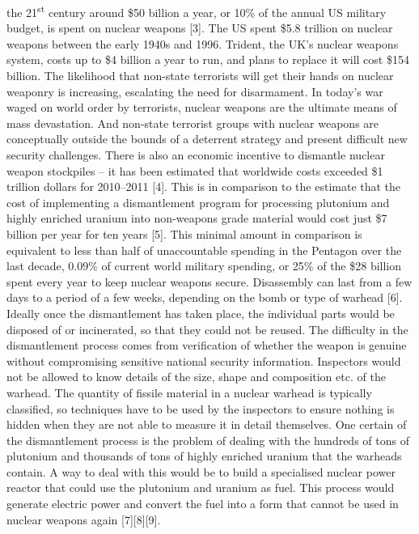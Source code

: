 \documentclass[twoside,titlepage,11pt,twocolumn,a4paper]{article}
\begin{document}
the 21\textsuperscript{st} century around \$50 billion a year, or 10\%
of the annual US military budget, is spent on nuclear weapons [3]. The
US spent \$5.8 trillion on nuclear weapons between the early 1940s and
1996. Trident, the UK's nuclear weapons system, costs up to \$4
billion a year to run, and plans to replace it will cost \$154
billion.  The likelihood that non-state terrorists will get their
hands on nuclear weaponry is increasing, escalating the need for
disarmament. In today's war waged on world order by terrorists,
nuclear weapons are the ultimate means of mass devastation. And
non-state terrorist groups with nuclear weapons are conceptually
outside the bounds of a deterrent strategy and present difficult new
security challenges.  There is also an economic incentive to dismantle
nuclear weapon stockpiles -- it has been estimated that worldwide
costs exceeded \$1 trillion dollars for 2010--2011 [4].  This is in
comparison to the estimate that the cost of implementing a
dismantlement program for processing plutonium and highly enriched
uranium into non-weapons grade material would cost just \$7 billion
per year for ten years [5]. This minimal amount in comparison is
equivalent to less than half of unaccountable spending in the Pentagon
over the last decade, 0.09\% of current world military spending, or
25\% of the \$28 billion spent every year to keep nuclear weapons
secure. Disassembly can last from a few days to a period of a few
weeks, depending on the bomb or type of warhead [6]. Ideally once the
dismantlement has taken place, the individual parts would be disposed
of or incinerated, so that they could not be reused. The difficulty in
the dismantlement process comes from verification of whether the
weapon is genuine without compromising sensitive national security
information. Inspectors would not be allowed to know details of the
size, shape and composition etc. of the warhead. The quantity of
fissile material in a nuclear warhead is typically classified, so
techniques have to be used by the inspectors to ensure nothing is
hidden when they are not able to measure it in detail themselves.  One
certain of the dismantlement process is the problem of dealing with
the hundreds of tons of plutonium and thousands of tons of highly
enriched uranium that the warheads contain. A way to deal with this
would be to build a specialised nuclear power reactor that could use
the plutonium and uranium as fuel. This process would generate
electric power and convert the fuel into a form that cannot be used in
nuclear weapons again [7][8][9].
\end{document}
